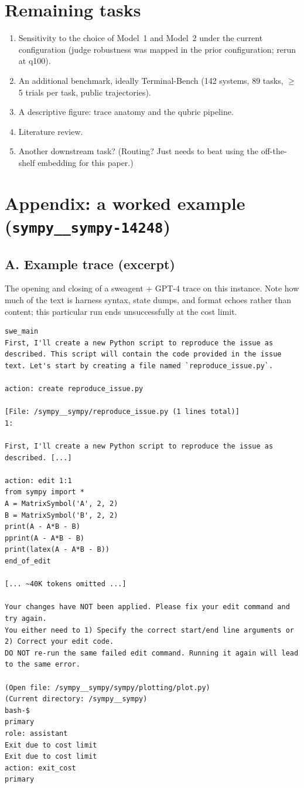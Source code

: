 \documentclass[10pt,twocolumn]{article}
\begin{document}
\section*{Remaining tasks}
\begin{enumerate}[leftmargin=1.4em,itemsep=1pt,topsep=1pt]
  \item Sensitivity to the choice of Model~1 and Model~2 under the current
  configuration (judge robustness was mapped in the prior configuration;
  rerun at q100).
  \item An additional benchmark, ideally Terminal-Bench (142 systems, 89
  tasks, $\geq$5 trials per task, public trajectories).
  \item A descriptive figure: trace anatomy and the qubric pipeline.
  \item Literature review.
  \item Another downstream task? (Routing? Just needs to beat using the
  off-the-shelf embedding for this paper.)
\end{enumerate}

\onecolumn
\section*{Appendix: a worked example (\texttt{sympy\_\_sympy-14248})}

\subsection*{A. Example trace (excerpt)}
The opening and closing of a sweagent + GPT-4 trace on this instance. Note
how much of the text is harness syntax, state dumps, and format echoes
rather than content; this particular run ends unsuccessfully at the cost
limit.

\begin{lstlisting}
swe_main
First, I'll create a new Python script to reproduce the issue as described. This script will contain the code provided in the issue text. Let's start by creating a file named `reproduce_issue.py`.

action: create reproduce_issue.py

[File: /sympy__sympy/reproduce_issue.py (1 lines total)]
1:

First, I'll create a new Python script to reproduce the issue as described. [...]

action: edit 1:1
from sympy import *
A = MatrixSymbol('A', 2, 2)
B = MatrixSymbol('B', 2, 2)
print(A - A*B - B)
pprint(A - A*B - B)
print(latex(A - A*B - B))
end_of_edit

[... ~40K tokens omitted ...]

Your changes have NOT been applied. Please fix your edit command and try again.
You either need to 1) Specify the correct start/end line arguments or 2) Correct your edit code.
DO NOT re-run the same failed edit command. Running it again will lead to the same error.

(Open file: /sympy__sympy/sympy/plotting/plot.py)
(Current directory: /sympy__sympy)
bash-$
primary
role: assistant
Exit due to cost limit
Exit due to cost limit
action: exit_cost
primary
\end{lstlisting}
\end{document}
